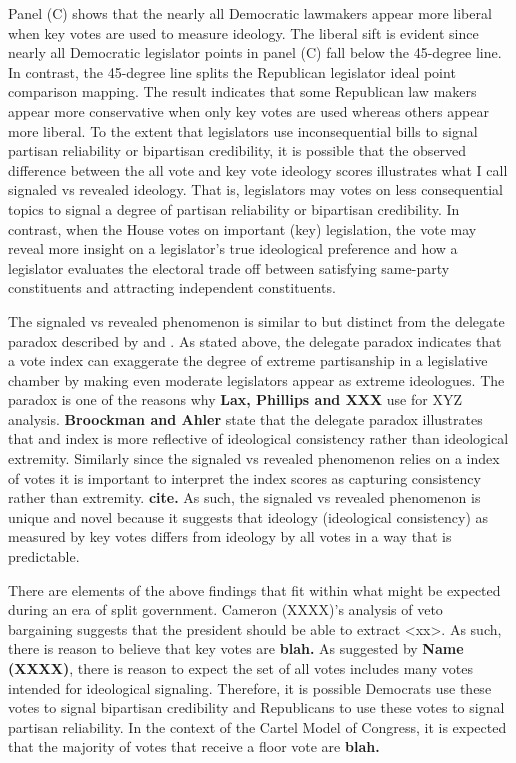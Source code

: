 \documentclass[10pt,letterpaper]{article}
\begin{document}
Panel (C) shows that the nearly all Democratic lawmakers appear more liberal when key votes are used to measure ideology. The liberal sift is evident since nearly all Democratic legislator points in panel (C) fall below the 45-degree line. In contrast, the 45-degree line splits the Republican legislator ideal point comparison mapping. The result indicates that some Republican law makers appear more conservative when only key votes are used whereas others appear more liberal. To the extent that legislators use inconsequential bills to signal partisan reliability or bipartisan credibility, it is possible that the observed difference between the all vote and key vote ideology scores illustrates what I call signaled vs revealed ideology. That is, legislators may votes on less consequential topics to signal a degree of partisan reliability or bipartisan credibility. In contrast, when the House votes on important (key) legislation, the vote may reveal more insight on a legislator's true ideological preference and how a legislator evaluates the electoral trade off between satisfying same-party constituents and attracting independent constituents.

 

The signaled vs revealed phenomenon is similar to but distinct from the delegate paradox described by \cite{Broockman2016} and \cite{Ahler2018}. As stated above, the delegate paradox indicates that a vote index can exaggerate the degree of extreme partisanship in a legislative chamber by making even moderate legislators appear as extreme ideologues. The paradox is one of the reasons why \textbf{Lax, Phillips and XXX} use for XYZ analysis. \textbf{Broockman and Ahler} state that the delegate paradox illustrates that and index is more reflective of ideological consistency rather than ideological extremity. Similarly since the signaled vs revealed phenomenon relies on a index of votes it is important to interpret the index scores as capturing consistency rather than extremity. \textbf{cite.} As such, the signaled vs revealed phenomenon is unique and novel because it suggests that ideology (ideological consistency) as measured by key votes differs from ideology by all votes in a way that is predictable.

There are elements of the above findings that fit within what might be expected during an era of split government. Cameron (XXXX)'s analysis of veto bargaining suggests that the president should be able to extract <xx>. As such, there is reason to believe that key votes are \textbf{blah.} As suggested by \textbf{Name (XXXX)}, there is reason to expect the set of all votes includes many votes intended for ideological signaling. Therefore, it is possible Democrats use these votes to signal bipartisan credibility and Republicans to use these votes to signal partisan reliability. In the context of the Cartel Model of Congress, it is expected that the majority of votes that receive a floor vote are \textbf{blah.}
\end{document}
